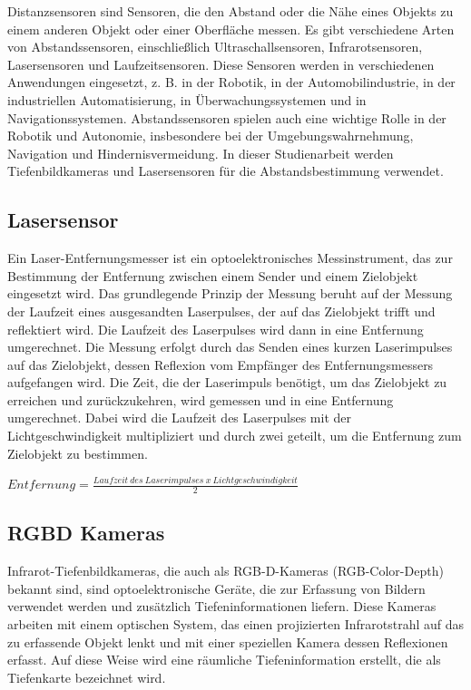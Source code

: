     Distanzsensoren sind Sensoren, die den Abstand oder die Nähe eines Objekts zu einem anderen Objekt oder einer Oberfläche messen. Es gibt verschiedene Arten von Abstandssensoren, einschließlich Ultraschallsensoren, Infrarotsensoren, Lasersensoren und Laufzeitsensoren. Diese Sensoren werden in verschiedenen Anwendungen eingesetzt, z. B. in der Robotik, in der Automobilindustrie, in der industriellen Automatisierung, in Überwachungssystemen und in Navigationssystemen. Abstandssensoren spielen auch eine wichtige Rolle in der Robotik und Autonomie, insbesondere bei der Umgebungswahrnehmung, Navigation und Hindernisvermeidung. In dieser Studienarbeit werden Tiefenbildkameras und Lasersensoren für die Abstandsbestimmung verwendet.

    \cite[vgl.][S. 157,S. 159]{SWB-165930377X}
    \subsection{Lasersensor}
    \label{chp:lasersensor}

    Ein Laser-Entfernungsmesser ist ein optoelektronisches Messinstrument, das zur Bestimmung der Entfernung zwischen einem Sender und einem Zielobjekt eingesetzt wird. Das grundlegende Prinzip der Messung beruht auf der Messung der Laufzeit eines ausgesandten Laserpulses, der auf das Zielobjekt trifft und reflektiert wird. Die Laufzeit des Laserpulses wird dann in eine Entfernung umgerechnet.
    Die Messung erfolgt durch das Senden eines kurzen Laserimpulses auf das Zielobjekt, dessen Reflexion vom Empfänger des Entfernungsmessers aufgefangen wird. Die Zeit, die der Laserimpuls benötigt, um das Zielobjekt zu erreichen und zurückzukehren, wird gemessen und in eine Entfernung umgerechnet. Dabei wird die Laufzeit des Laserpulses mit der Lichtgeschwindigkeit multipliziert und durch zwei geteilt, um die Entfernung zum Zielobjekt zu bestimmen.
    \begin{center}
    \label{math:distance}
    $Entfernung = \frac{Laufzeit\ des\ Laserimpulses\ x\ Lichtgeschwindigkeit}{2}$
    \end{center}

    \cite[vgl.][S. 159]{SWB-165930377X}


    \subsection{RGBD Kameras}

    Infrarot-Tiefenbildkameras, die auch als RGB-D-Kameras (RGB-Color-Depth) bekannt sind, sind optoelektronische Geräte, die zur Erfassung von Bildern verwendet werden und zusätzlich Tiefeninformationen liefern. Diese Kameras arbeiten mit einem optischen System, das einen projizierten Infrarotstrahl auf das zu erfassende Objekt lenkt und mit einer speziellen Kamera dessen Reflexionen erfasst. Auf diese Weise wird eine räumliche Tiefeninformation erstellt, die als Tiefenkarte bezeichnet wird.

